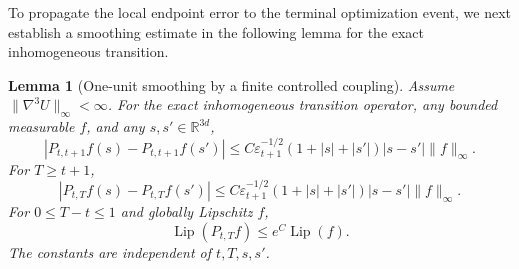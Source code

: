 \documentclass[11pt]{article}
\newtheorem{lemma}[theorem]{Lemma}
\theoremstyle{definition}
\newcommand{\R}{\mathbb R}
\newcommand{\eps}{\varepsilon}
\begin{document}
To propagate the local endpoint error to the terminal optimization event, we next
establish a smoothing estimate in the following lemma for the exact inhomogeneous transition.

\begin{lemma}[One-unit smoothing by a finite controlled coupling]\label{lem:smoothing}
Assume $\|\nabla^3U\|_\infty<\infty$. For the exact inhomogeneous transition
operator, any bounded measurable $f$, and any $s,s'\in\R^{3d}$,
\begin{equation}\label{eq:smoothing}
 |P_{t,t+1}f(s)-P_{t,t+1}f(s')|
 \leq C\eps_{t+1}^{-1/2}(1+|s|+|s'|)|s-s'|\|f\|_\infty.
\end{equation}
For $T\geq t+1$,
\[
 |P_{t,T}f(s)-P_{t,T}f(s')|
 \leq C\eps_{t+1}^{-1/2}(1+|s|+|s'|)|s-s'|\|f\|_\infty.
\]
For $0\leq T-t\leq1$ and globally Lipschitz $f$,
\[
\operatorname{Lip}(P_{t,T}f)\leq e^C\operatorname{Lip}(f).
\]
The constants are independent of $t,T,s,s'$.
\end{lemma}
\end{document}
